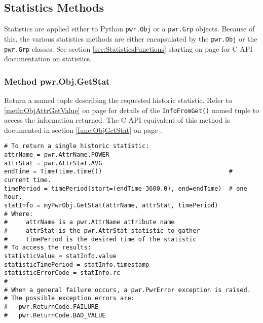 \subsection{Statistics Methods} \label{sec:PythonStatisticsMethods}

Statistics are applied either to Python \texttt{pwr.Obj} or a \texttt{pwr.Grp}
objects. Because of this, the various statistics methods are either
encapsulated by the \texttt{pwr.Obj} or the \texttt{pwr.Grp} classes. See
section \ref{sec:StatisticsFunctions} starting on page
\pageref{sec:StatisticsFunctions} for C API documentation on statistics.

\subsubsection{Method pwr.Obj.GetStat} \label{meth:ObjGetStat}

Return a named tuple describing the requested historic statistic. Refer to
\ref{meth:ObjAttrGetValue} on page \pageref{meth:ObjAttrGetValue} for details
of the \texttt{InfoFromGet()} named tuple to access the information returned. The
C API equivalent of this method is documented in section
\ref{func:ObjGetStat} on page \pageref{func:ObjGetStat}.

\begin{center}\begin{minipage}{.95\linewidth}\begin{lstlisting}
# To return a single historic statistic:
attrName = pwr.AttrName.POWER
attrStat = pwr.AttrStat.AVG
endTime = Time(time.time())                                   # current time.
timePeriod = timePeriod(start=(endTime-3600.0), end=endTime)  # one hour.
statInfo = myPwrObj.GetStat(attrName, attrStat, timePeriod)
# Where:
#     attrName is a pwr.AttrName attribute name
#     attrStat is the pwr.AttrStat statistic to gather
#     timePeriod is the desired time of the statistic
# To access the results:
statisticValue = statInfo.value
statisticTimePeriod = statInfo.timestamp
statisticErrorCode = statInfo.rc
#
# When a general failure occurs, a pwr.PwrError exception is raised.
# The possible exception errors are:
#   pwr.ReturnCode.FAILURE
#   pwr.ReturnCode.BAD_VALUE
\end{lstlisting}\end{minipage}\end{center}


